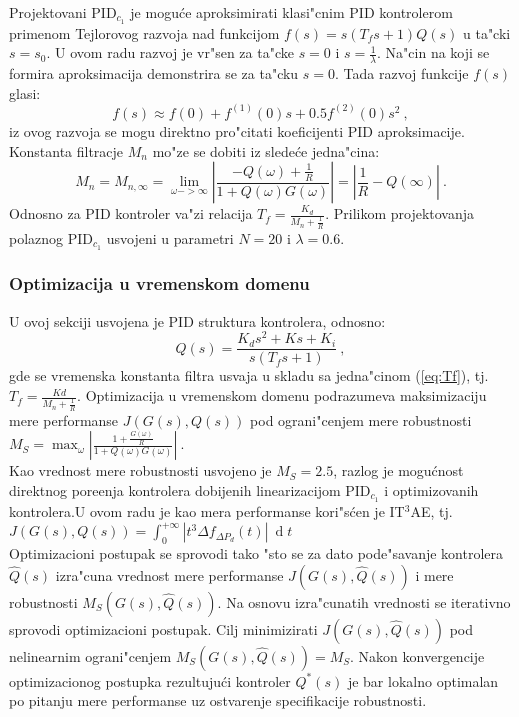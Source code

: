 \documentclass[a4paper,11pt]{article}
\theoremstyle{definition} \newtheorem{deff}{Definicija}[section]
\theoremstyle{definition} \newtheorem{prim}[deff]{Primer}
\theoremstyle{plain} \newtheorem{teor}[deff]{Teorema}
\begin{document}
	Projektovani PID$_{c_1}$ je mogu\'ce aproksimirati klasi"cnim PID kontrolerom primenom Tejlorovog razvoja nad funkcijom $f(s) = s(T_fs+1)Q(s)$ u ta"cki $s = s_0$. U ovom radu razvoj je vr"sen za ta"cke $s=0$ i $s=\frac{1}{\lambda}$. Na"cin na koji se formira aproksimacija demonstrira se za ta"cku $s = 0$. Tada razvoj funkcije $f(s)$ glasi:
	\begin{equation}
		f(s) \approx f(0) + f^{(1)}(0)s + 0.5f^{(2)}(0)s^2~,
	\end{equation}
	iz ovog razvoja se mogu direktno pro"citati koeficijenti PID aproksimacije. Konstanta filtracje $M_n$ mo"ze se dobiti iz slede\'ce jedna"cina: 
	\begin{equation} \label{eq:Tf}
		M_n = M_{n, \infty} = \lim\limits_{\omega->\infty}|\frac{-Q(\omega) + \frac{1}{R}}{1 + Q(\omega)G(\omega)}| = |\frac{1}{R} - Q(\infty)|~.
	\end{equation}
	Odnosno za PID kontroler va"zi relacija $T_f= \frac{K_d}{M_n+\frac{1}{R}}$. Prilikom projektovanja polaznog PID$_{c_1}$ usvojeni u parametri $N = 20$ i $\lambda = 0.6$.
	
	\clearpage
	

	\subsubsection{Optimizacija u vremenskom domenu} \label{sec:opt_vr}
	
	U ovoj sekciji usvojena je PID struktura kontrolera, odnosno:
	\begin{equation}
		Q(s) = \frac{K_ds^2 + Ks+K_i}{s(T_fs+1)}~, 
	\end{equation}
	gde se vremenska konstanta filtra usvaja u skladu sa jedna"cinom (\ref{eq:Tf}), tj. $T_f = \frac{Kd}{M_n+\frac{1}{R}}$. Optimizacija u vremenskom domenu podrazumeva maksimizaciju mere performanse $J(G(s), Q(s))$ pod ograni"cenjem mere robustnosti $M_S =\operatorname{max}_{\omega}|\frac{1+\frac{G(\omega)}{R}}{1+Q(\omega)G(\omega)}|~$. \\
	
	Kao vrednost mere robustnosti usvojeno je $M_S = 2.5$, razlog je mogu\'cnost direktnog pore\dj{}enja kontrolera dobijenih linearizacijom PID$_{c_1}$ i optimizovanih kontrolera.U ovom radu je kao mera performanse kori"s\'cen je IT$^3$AE, tj. $J(G(s), Q(s)) = \int_{0}^{+\infty}|t^3\Delta f_{\Delta P_d}(t)|~\operatorname{d}t$ \\
	
	Optimizacioni postupak se sprovodi tako "sto se za dato pode"savanje kontrolera $\hat{Q}(s)$ izra"cuna vrednost mere performanse $J(G(s), \hat{Q}(s))$ i mere robustnosti $M_S(G(s), \hat{Q}(s))$. Na osnovu izra"cunatih vrednosti se iterativno sprovodi optimizacioni postupak. Cilj minimizirati  $J(G(s), \hat{Q}(s))$ pod nelinearnim ograni"cenjem $M_S(G(s), \hat{Q}(s)) = M_S$. Nakon konvergencije optimizacionog postupka rezultuju\'ci kontroler $Q^{*}(s)$ je bar lokalno optimalan po pitanju mere performanse uz ostvarenje specifikacije robustnosti. \\
	
\end{document}
